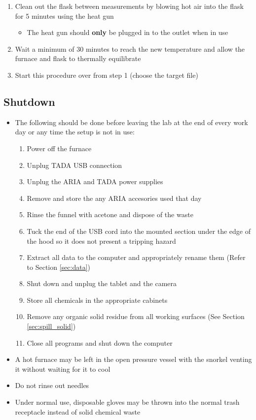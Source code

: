 \documentclass[letterpaper,11pt]{article}
\begin{document}
\begin{enumerate}
    \item Clean out the flask between measurements by blowing hot air into
            the flask for 5 minutes using the heat gun
            \begin{itemize}
            \item The heat gun should \textbf{only} be plugged in to the outlet 
                when in use
            \end{itemize}
            
        \item Wait a minimum of 30 minutes to reach the new temperature and 
            allow the furnace and flask to thermally equilibrate
    \item Start this procedure over from step 1 (choose the target file)
    \end{enumerate}

	
\subsection{Shutdown}
    \begin{itemize}
    \item The following should be done before leaving the lab at the end of 
        every work day or any time the setup is not in use:
        \begin{enumerate}
        \item Power off the furnace
        \item Unplug TADA USB connection
        \item Unplug the ARIA and TADA power supplies 
        \item Remove and store the any ARIA accesories used that day
        \item Rinse the funnel with acetone and dispose of the waste
        \item Tuck the end of the USB cord into the mounted section under the 
            edge of the hood so it does not present a tripping hazard
        \item Extract all data to the computer and appropriately rename them 
            (Refer to Section \ref{sec:data})
        \item Shut down and unplug the tablet and the camera
        \item Store all chemicals in the appropriate cabinets
        \item Remove any organic solid residue from all working surfaces 
            (See Section \ref{sec:spill_solid})
        \item Close all programs and shut down the computer
        \end{enumerate}
    
    \item A hot furnace may be left in the open pressure vessel with the snorkel 
        venting it without waiting for it to cool
    \item Do not rinse out needles %
    \item Under normal use, disposable gloves may be thrown into the normal 
        trash receptacle instead of solid chemical waste
    \end{itemize}
    
\end{document}
